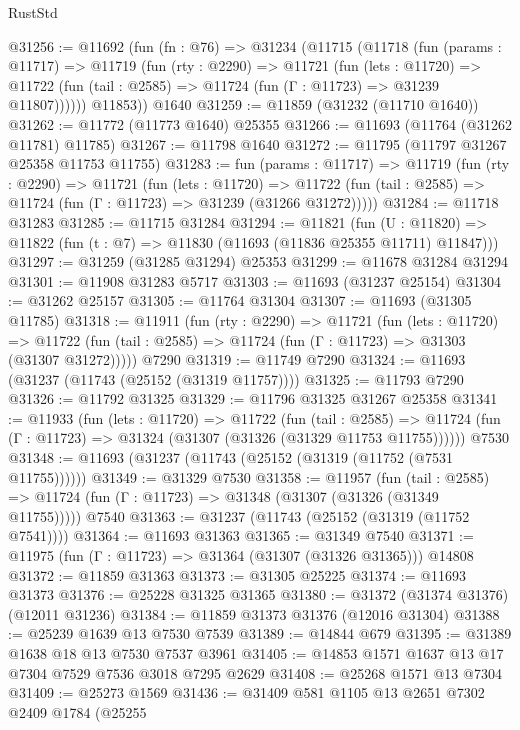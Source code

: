 \begin{lexlean}{RustStd}
\begin{coremodule}
@31256 := @11692
    (fun (fn : @76) =>
    @31234
      (@11715
        (@11718
          (fun (params : @11717) =>
          @11719
            (fun (rty : @2290) =>
            @11721
              (fun (lets : @11720) =>
              @11722 (fun (tail : @2585) => @11724 (fun (Γ : @11723) => @31239 @11807))))))
        @11853))
    @1640
@31259 := @11859 (@31232 (@11710 @1640))
@31262 := @11772 (@11773 @1640) @25355
@31266 := @11693 (@11764 (@31262 @11781) @11785)
@31267 := @11798 @1640
@31272 := @11795 (@11797 @31267 @25358 @11753 @11755)
@31283 := fun (params : @11717) =>
  @11719
    (fun (rty : @2290) =>
    @11721
      (fun (lets : @11720) =>
      @11722 (fun (tail : @2585) => @11724 (fun (Γ : @11723) => @31239 (@31266 @31272)))))
@31284 := @11718 @31283
@31285 := @11715 @31284
@31294 := @11821
    (fun (U : @11820) => @11822 (fun (t : @7) => @11830 (@11693 (@11836 @25355 @11711) @11847)))
@31297 := @31259 (@31285 @31294) @25353
@31299 := @11678 @31284 @31294
@31301 := @11908 @31283 @5717
@31303 := @11693 (@31237 @25154)
@31304 := @31262 @25157
@31305 := @11764 @31304
@31307 := @11693 (@31305 @11785)
@31318 := @11911
    (fun (rty : @2290) =>
    @11721
      (fun (lets : @11720) =>
      @11722 (fun (tail : @2585) => @11724 (fun (Γ : @11723) => @31303 (@31307 @31272)))))
    @7290
@31319 := @11749 @7290
@31324 := @11693 (@31237 (@11743 (@25152 (@31319 @11757))))
@31325 := @11793 @7290
@31326 := @11792 @31325
@31329 := @11796 @31325 @31267 @25358
@31341 := @11933
    (fun (lets : @11720) =>
    @11722
      (fun (tail : @2585) =>
      @11724 (fun (Γ : @11723) => @31324 (@31307 (@31326 (@31329 @11753 @11755))))))
    @7530
@31348 := @11693 (@31237 (@11743 (@25152 (@31319 (@11752 (@7531 @11755))))))
@31349 := @31329 @7530
@31358 := @11957
    (fun (tail : @2585) => @11724 (fun (Γ : @11723) => @31348 (@31307 (@31326 (@31349 @11755)))))
    @7540
@31363 := @31237 (@11743 (@25152 (@31319 (@11752 @7541))))
@31364 := @11693 @31363
@31365 := @31349 @7540
@31371 := @11975 (fun (Γ : @11723) => @31364 (@31307 (@31326 @31365))) @14808
@31372 := @11859 @31363
@31373 := @31305 @25225
@31374 := @11693 @31373
@31376 := @25228 @31325 @31365
@31380 := @31372 (@31374 @31376) (@12011 @31236)
@31384 := @11859 @31373 @31376 (@12016 @31304)
@31388 := @25239 @1639 @13 @7530 @7539
@31389 := @14844 @679
@31395 := @31389 @1638 @18 @13 @7530 @7537 @3961
@31405 := @14853 @1571 @1637 @13 @17 @7304 @7529 @7536 @3018 @7295 @2629
@31408 := @25268 @1571 @13 @7304
@31409 := @25273 @1569
@31436 := @31409
    @581
    @1105
    @13
    @2651
    @7302
    @2409
    @1784
    (@25255

\end{coremodule}
\end{lexlean}
